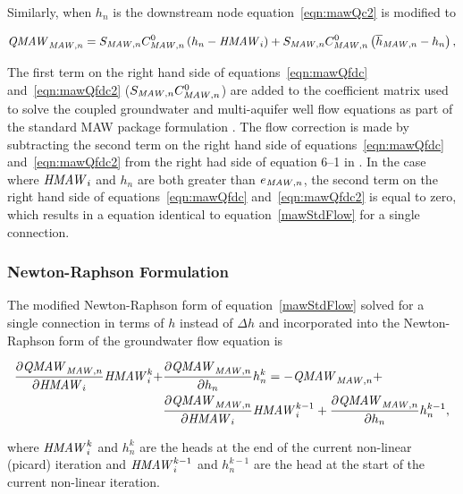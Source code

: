 Similarly, when $h_n$ is the downstream node equation~\ref{eqn:mawQc2} is modified to

\begin{align}
	\label{eqn:mawQfdc2}
	\mathit{QMAW}_{\mathit{MAW},n} = S_{\mathit{MAW},n} C_{\mathit{MAW},n}^0 \left( h_n - \mathit{HMAW}_{i} \right) + S_{\mathit{MAW},n} C_{\mathit{MAW},n}^0 \left( \overline{h}_{\mathit{MAW},n} - h_n \right),
\end{align}

The first term on the right hand side of equations~\ref{eqn:mawQfdc} and~\ref{eqn:mawQfdc2} ($S_{\mathit{MAW},n} C_{\mathit{MAW},n}^0$) are added to the coefficient matrix used to solve the coupled groundwater and multi-aquifer well flow equations as part of the standard MAW package formulation \citep[eq. 7--55]{modflow6gwf}. The flow correction is made by subtracting the second term on the right hand side of equations~\ref{eqn:mawQfdc} and~\ref{eqn:mawQfdc2} from the right had side of equation 6--1 in \cite{modflow6gwf}. In the case where $\mathit{HMAW}_{i}$ and $h_n$ are both greater than $e_{\mathit{MAW},n}$, the second term on the right hand side of equations~\ref{eqn:mawQfdc} and~\ref{eqn:mawQfdc2} is equal to zero, which results in a equation identical to equation~\ref{mawStdFlow} for a single connection.


\subsubsection{Newton-Raphson Formulation}

The modified Newton-Raphson form of equation~\ref{mawStdFlow} solved for a single connection in terms of $h$ instead of $\Delta h$  and incorporated into the Newton-Raphson form of the groundwater flow equation \citep[eq. 2--26]{modflow6gwf} is

\begin{equation}
	\label{eqn:nrMawQ}
	\begin{aligned}
		\frac{\partial \mathit{QMAW}_{\mathit{MAW},n}}{\partial \mathit{HMAW}_i}  \mathit{HMAW}_i^k + &\frac{\partial \mathit{QMAW}_{\mathit{MAW},n}}{\partial h_n}  h^k_n = - \mathit{QMAW}_{\mathit{MAW},n} + \\
		&\frac{\partial \mathit{QMAW}_{\mathit{MAW},n}}{\partial \mathit{HMAW}_i}  \mathit{HMAW}_i^{k-1} +  \frac{\partial \mathit{QMAW}_{\mathit{MAW},n}}{\partial h_n}  h^{k-1}_n ,
	\end{aligned}
\end{equation}

\noindent where $\mathit{HMAW}_i^k$ and $h^k_n$ are the heads at the end of the current non-linear (picard) iteration and $\mathit{HMAW}_i^{k-1}$ and $h^{k-1}_n$ are the head at the start of the current non-linear iteration.

